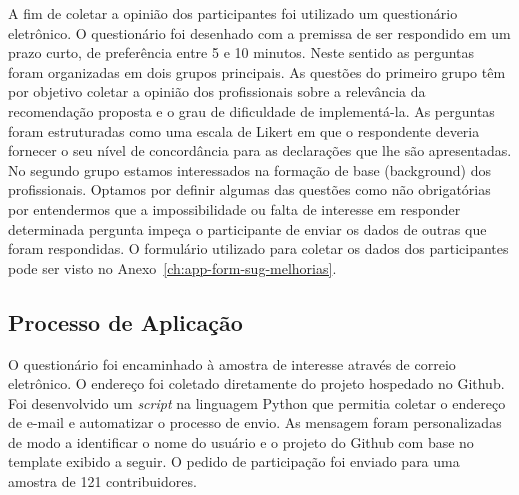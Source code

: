 A fim de coletar a opinião dos participantes foi utilizado um questionário
eletrônico. O questionário foi desenhado com a premissa de ser respondido em um
prazo curto, de preferência entre 5 e 10 minutos. Neste sentido as perguntas
foram organizadas em dois grupos principais. As questões do primeiro grupo têm
por objetivo coletar a opinião dos profissionais sobre a relevância da
recomendação proposta e o grau de dificuldade de implementá-la. As perguntas
foram estruturadas como uma escala de Likert em que o respondente deveria
fornecer o seu nível de concordância para as declarações que lhe são
apresentadas. No segundo grupo estamos interessados na formação de base
(background) dos profissionais. Optamos por definir algumas das questões como
não obrigatórias por entendermos que a impossibilidade ou falta de interesse em
responder determinada pergunta impeça o participante de enviar os dados de
outras que foram respondidas. O formulário utilizado para coletar os dados dos
participantes pode ser visto no Anexo~\ref{ch:app-form-sug-melhorias}.

\subsection{Processo de Aplicação}
\label{ssub:processo_de_aplicação}

O questionário foi encaminhado à amostra de interesse através de correio
eletrônico. O endereço foi coletado diretamente do projeto hospedado no Github.
Foi desenvolvido um \textit{script} na linguagem Python que permitia coletar o
endereço de e-mail e automatizar o processo de envio. As mensagem foram
personalizadas de modo a identificar o nome do usuário e o projeto do Github com
base no template exibido a seguir. O pedido de participação foi enviado para uma
amostra de 121 contribuidores.


